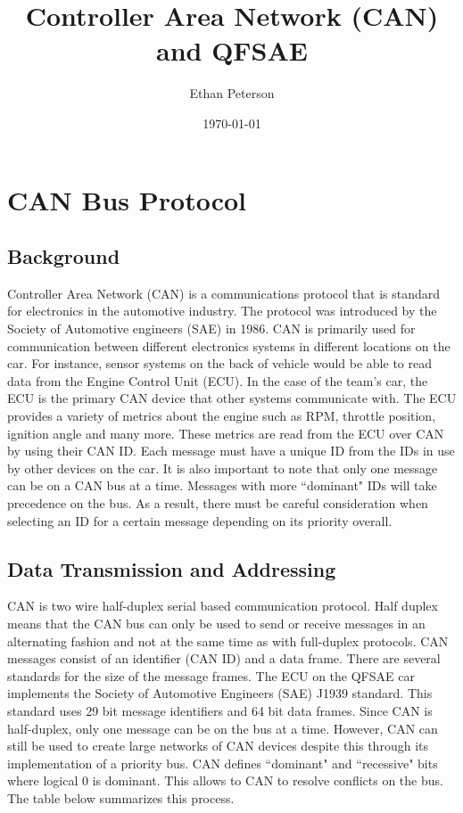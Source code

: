 \documentclass[letterpaper]{article}
\title{Controller Area Network (CAN) and QFSAE}
\author{Ethan Peterson}
\date{\today}
\begin{document}
\maketitle

\section{CAN Bus Protocol}

\subsection{Background}
Controller Area Network (CAN) is a communications protocol that is standard for
electronics in the automotive industry. The protocol was introduced by the
Society of Automotive engineers (SAE) in 1986. CAN is primarily used for
communication between different electronics systems in different locations on
the car. For instance, sensor systems on the back of vehicle would be able to
read data from the Engine Control Unit (ECU). In the case of the team's car, the
ECU is the primary CAN device that other systems communicate with. The ECU
provides a variety of metrics about the engine such as RPM, throttle position,
ignition angle and many more. These metrics are read from the ECU over CAN by
using their CAN ID. Each message must have a unique ID from the IDs in use by
other devices on the car. It is also important to note that only one message can
be on a CAN bus at a time. Messages with more ``dominant" IDs will take
precedence on the bus. As a result, there must be careful consideration when
selecting an ID for a certain message depending on its priority overall.

\subsection{Data Transmission and Addressing}
CAN is two wire half-duplex serial based communication protocol. Half duplex
means that the CAN bus can only be used to send or receive messages in an
alternating fashion and not at the same time as with full-duplex protocols. CAN
messages consist of an identifier (CAN ID) and a data frame. There are several
standards for the size of the message frames. The ECU on the QFSAE car
implements the Society of Automotive Engineers (SAE) J1939 standard. This
standard uses 29 bit message identifiers and 64 bit data frames. Since CAN is
half-duplex, only one message can be on the bus at a time. However, CAN can
still be used to create large networks of CAN devices despite this through
its implementation of a priority bus. CAN defines ``dominant" and ``recessive"
bits where logical 0 is dominant. This allows to CAN to resolve conflicts on the
bus. The table below summarizes this process.
\end{document}
